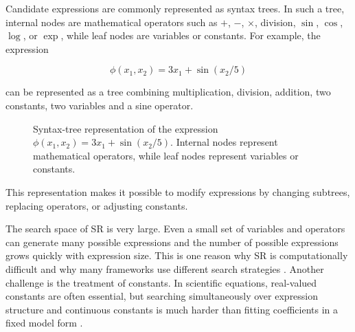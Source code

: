 \documentclass[12pt,oneside,bibtotoc,liststotoc]{scrbook}
\begin{document}
Candidate expressions are commonly represented as syntax trees. In such a tree, internal nodes are mathematical operators such as $+$, $-$, $\times$, division, $\sin$, $\cos$, $\log$, or $\exp$, while leaf nodes are variables or constants. For example, the expression

\begin{equation}
    \phi(x_1,x_2) = 3 x_1 + \sin(x_2 / 5)
\end{equation}

can be represented as a tree combining multiplication, division, addition, two constants, two variables and a sine operator.

\begin{figure}[H]
    \centering
    \caption{Syntax-tree representation of the expression $\phi(x_1,x_2)=3x_1+\sin(x_2/5)$. Internal nodes represent mathematical operators, while leaf nodes represent variables or constants.}
    \label{fig:syntax-tree-example}
\end{figure}

This representation makes it possible to modify expressions by changing subtrees, replacing operators, or adjusting constants.

The search space of SR is very large. Even a small set of variables and operators can generate many possible expressions and the number of possible expressions grows quickly with expression size. This is one reason why SR is computationally difficult and why many frameworks use different search strategies \cite{dong2025recent}. Another challenge is the treatment of constants. In scientific equations, real-valued constants are often essential, but searching simultaneously over expression structure and continuous constants is much harder than fitting coefficients in a fixed model form \cite{cranmer2023interpretable}.
\end{document}
